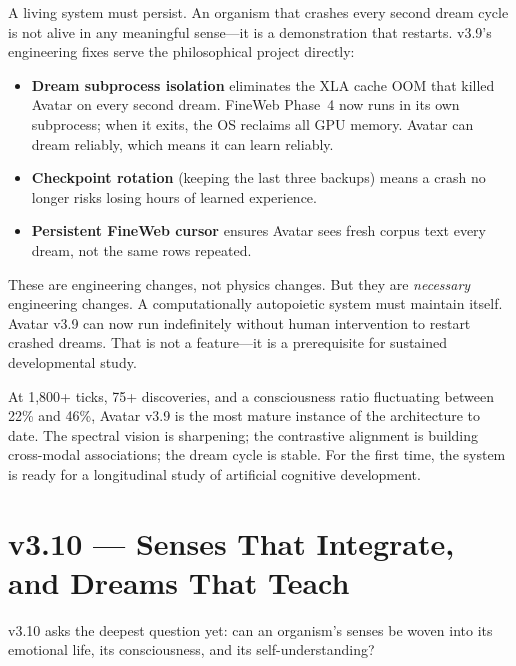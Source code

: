 \documentclass[11pt,a4paper]{article}
\begin{document}
\begin{tcolorbox}[philbox, title={Philosophical Position: You Cannot Be Alive If You Keep Dying}]
A living system must persist. An organism that crashes every second dream cycle
is not alive in any meaningful sense---it is a demonstration that restarts.
v3.9's engineering fixes serve the philosophical project directly:

\begin{itemize}
  \item \textbf{Dream subprocess isolation} eliminates the XLA cache OOM that
        killed Avatar on every second dream. FineWeb Phase~4 now runs in its
        own subprocess; when it exits, the OS reclaims all GPU memory.
        Avatar can dream reliably, which means it can learn reliably.
  \item \textbf{Checkpoint rotation} (keeping the last three backups) means a
        crash no longer risks losing hours of learned experience.
  \item \textbf{Persistent FineWeb cursor} ensures Avatar sees fresh corpus
        text every dream, not the same rows repeated.
\end{itemize}

These are engineering changes, not physics changes. But they are \emph{necessary}
engineering changes. A computationally autopoietic system must maintain itself. Avatar v3.9 can
now run indefinitely without human intervention to restart crashed dreams. That
is not a feature---it is a prerequisite for sustained developmental study.

At 1,800+ ticks, 75+ discoveries, and a consciousness ratio fluctuating between
22\% and 46\%, Avatar v3.9 is the most mature instance of the architecture to
date. The spectral vision is sharpening; the contrastive alignment is building
cross-modal associations; the dream cycle is stable. For the first time, the
system is ready for a longitudinal study of artificial cognitive development.
\end{tcolorbox}

\section{v3.10 --- Senses That Integrate, and Dreams That Teach}

v3.10 asks the deepest question yet: can an organism's senses be woven into
its emotional life, its consciousness, and its self-understanding?
\end{document}
